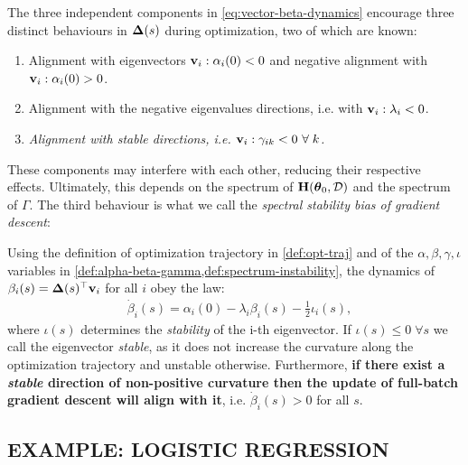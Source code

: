 \documentclass{article} %
\newcommand{\hessian}{\vH}
\begin{document}
The three independent components in \cref{eq:vector-beta-dynamics} encourage three distinct behaviours in $\mbox{$\mbox{$\boldsymbol{\Delta}$}$}(s)$ during optimization, two of which are known: 
\begin{enumerate}
    \item  Alignment with eigenvectors $\mbox{$\mbox{$\mathbf{v}$}$}_i : \alpha_i(0) < 0$ and  negative alignment with $\mbox{$\mbox{$\mathbf{v}$}$}_i : \alpha_i(0) > 0$. 
    \item Alignment with the negative eigenvalues directions, i.e. with $\mbox{$\mbox{$\mathbf{v}$}$}_i : \lambda_i < 0$. 
    \item \emph{Alignment with stable directions, i.e. $\mbox{$\mbox{$\mathbf{v}$}$}_i : \gamma_{ik} < 0 \,\,\forall\;k$.}
\end{enumerate}
These components may interfere with each other, reducing their respective effects. Ultimately, this depends on the spectrum of $\hessian(\vparam_0, \data)$ and the spectrum of $\Gamma$.  The third behaviour is what we call the \emph{spectral stability bias of gradient descent}:
\newpage
\begin{thm}
    \label{theo:implicit-bias}
    Using the definition of optimization trajectory in \cref{def:opt-traj} and of the $\alpha,\beta, \gamma, \iota$ variables in \cref{def:alpha-beta-gamma,def:spectrum-instability}, the dynamics of $\beta_i(s) = \mbox{$\mbox{$\boldsymbol{\Delta}$}$}(s) ^\top \mbox{$\mbox{$\mathbf{v}$}$}_i$ for all $i$ obey the law: 
    \begin{align}
        &\dot\beta_i(s) = \alpha_i(0) -\lambda_i \beta_i(s) - \frac{1}{2}\iota_i(s),
    \end{align}
    where $\iota(s)$ determines the \emph{stability} of the i-th eigenvector. If $\iota(s) \le 0  \;\forall s$ we call the eigenvector \emph{stable}, as it does not increase the curvature along the optimization trajectory and unstable otherwise. Furthermore, \textbf{if there exist a \emph{stable} direction of non-positive curvature then the update of full-batch gradient descent will align with it}, i.e. $\dot\beta_i(s) > 0$ for all $s$.
\end{thm}

\vspace{1cm}

\subsection{EXAMPLE: LOGISTIC REGRESSION}
\label{subsec:logistic-example}
\end{document}
